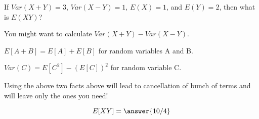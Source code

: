 \documentclass{ximera}
\begin{document}
\begin{problem}
If $Var(X + Y) = 3$, $Var(X-Y)=1$, $E(X) = 1$, and $E(Y) = 2$, then what is $E(XY)$? 
\begin{hint}
\item You might want to calculate $Var(X+Y)-Var(X-Y)$. 
\item $E[A+B]=E[A]+E[B]$ for random variables A and B.
\item $Var(C)=E[C^2]-(E[C])^2$ for random variable C.
\item Using the above two facts above will lead to cancellation of bunch of terms and will leave only the ones you need!
\end{hint}

\begin{prompt}
$$
E[XY]=\answer{10/4}
$$ 
\end{prompt}

\end{problem}
\end{document}
